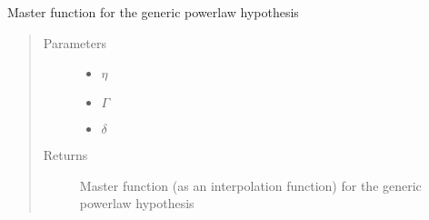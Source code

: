 \documentclass[letterpaper,10pt,english]{sphinxmanual}
\begin{document}
\begin{fulllineitems}
\label{\detokenize{diffsph.spectra:diffsph.spectra.synchrotron.Mst_pw}}
\sphinxAtStartPar
Master function for the generic power\sphinxhyphen{}law hypothesis
\begin{quote}\begin{description}
\item[{Parameters}] \leavevmode\begin{itemize}
\item {} 
\sphinxAtStartPar
{} \textendash{} \(\eta\)

\item {} 
\sphinxAtStartPar
{} \textendash{} \(\Gamma\)

\item {} 
\sphinxAtStartPar
{} \textendash{} \(\delta\)

\end{itemize}

\item[{Returns}] \leavevmode
\sphinxAtStartPar
Master function (as an interpolation function) for the generic power\sphinxhyphen{}law hypothesis

\end{description}\end{quote}

\end{fulllineitems}

\end{document}
